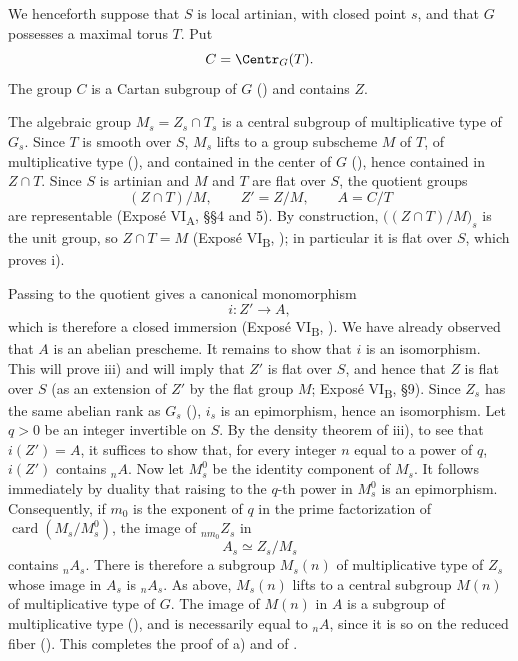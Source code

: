 We henceforth suppose that \(S\) is local artinian, with closed
point \(s\), and that \(G\) possesses a maximal torus \(T\). Put
\[
  C=\Centr_G(T).
\]
The group \(C\) is a Cartan subgroup of \(G\) ()
and contains \(Z\).

The algebraic group \(M_s=Z_s\cap T_s\) is a central subgroup of
multiplicative type of \(G_s\). Since \(T\) is smooth over \(S\),
\(M_s\) lifts to a group subscheme \(M\) of \(T\), of
multiplicative type (), and contained in the
center of \(G\) (), hence contained in \(Z\cap T\).
Since \(S\) is artinian and \(M\) and \(T\) are flat over \(S\),
the quotient groups
\[
  (Z\cap T)/M,\qquad Z'=Z/M,\qquad A=C/T
\]
are representable (Exposé VI\textsubscript{A}, \S\S4 and 5).
By construction, \(\bigl((Z\cap T)/M\bigr)_s\) is the unit group,
so \(Z\cap T=M\) (Exposé VI\textsubscript{B}, ); in
particular it is flat over \(S\), which proves  i).

Passing to the quotient gives a canonical monomorphism
\[
  i:Z'\longrightarrow A,
\]
which is therefore a closed immersion (Exposé
VI\textsubscript{B}, ). We have already observed that \(A\)
is an abelian prescheme. It remains to show that \(i\) is an
isomorphism. This will prove  iii) and will imply that \(Z'\)
is flat over \(S\), and hence that \(Z\) is flat over \(S\)
(as an extension of \(Z'\) by the flat group \(M\); Exposé
VI\textsubscript{B}, \S9). Since \(Z_s\) has the same abelian rank
as \(G_s\) (), \(i_s\) is an epimorphism, hence an
isomorphism. Let \(q>0\) be an integer invertible on \(S\). By the
density theorem of  iii), to see that \(i(Z')=A\), it suffices
to show that, for every integer \(n\) equal to a power of \(q\),
\(i(Z')\) contains \({}_nA\). Now let \(M_s^0\) be the identity
component of \(M_s\). It follows immediately by duality that
raising to the \(q\)-th power in \(M_s^0\) is an epimorphism.
Consequently, if \(m_0\) is the exponent of \(q\) in the prime
factorization of \(\operatorname{card}(M_s/M_s^0)\), the image of
\({}_{nm_0}Z_s\) in
\[
  A_s\simeq Z_s/M_s
\]
contains \({}_nA_s\). There is therefore a subgroup \(M_s(n)\) of
multiplicative type of \(Z_s\) whose image in \(A_s\) is
\({}_nA_s\). As above, \(M_s(n)\) lifts to a central subgroup
\(M(n)\) of multiplicative type of \(G\). The image of \(M(n)\)
in \(A\) is a subgroup of multiplicative type (),
and is necessarily equal to \({}_nA\), since it is so on the
reduced fiber (). This completes the proof of
 a) and of .


